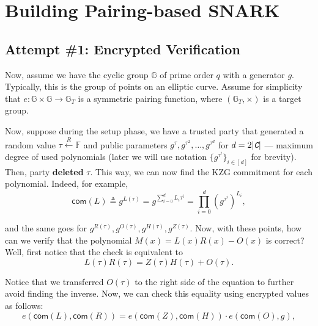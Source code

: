 \documentclass[../lecture-notes.tex]{subfiles}
\begin{document}
\section{Building Pairing-based SNARK}
\subsection{Attempt \#1: Encrypted Verification}

Now, assume we have the cyclic group $\mathbb{G}$ of prime order $q$ with a generator $g$. Typically, this is the group of points on an elliptic curve. Assume for simplicity that $e: \mathbb{G} \times \mathbb{G} \to \mathbb{G}_T$ is a symmetric pairing function, where $(\mathbb{G}_T, \times)$ is a target group.

Now, suppose during the setup phase, we have a trusted party that generated a random value $\tau \xleftarrow{R} \mathbb{F}$ and public parameters $g^{\tau},g^{\tau^2},\dots,g^{\tau^{d}}$ for $d=2|\textit{\texttt{C}}|$ --- maximum degree of used polynomials (later we will use notation $\{g^{\tau^i}\}_{i \in [d]}$ for brevity). Then, party \textbf{deleted} $\tau$. This way, we can now find the KZG commitment for each polynomial. Indeed, for example,
\begin{equation*}
    \mathsf{com}(L) \triangleq g^{L(\tau)} = g^{\sum_{i=0}^d L_i \tau^i} = \prod_{i=0}^d (g^{\tau^i})^{L_i},
\end{equation*}

and the same goes for $g^{R(\tau)}, g^{O(\tau)}, g^{H(\tau)}, g^{Z(\tau)}$. Now, with these points, how can we verify that the polynomial $M(x) = L(x)R(x) - O(x)$ is correct? Well, first notice that the check is equivalent to
\begin{equation*}
    L(\tau)R(\tau) = Z(\tau)H(\tau) + O(\tau).
\end{equation*}

Notice that we transferred $O(\tau)$ to the right side of the equation to further avoid finding the inverse. Now, we can check this equality using encrypted values as follows:
\begin{equation*}
    e(\mathsf{com}(L), \mathsf{com}(R)) = e(\mathsf{com}(Z), \mathsf{com}(H)) \cdot e(\mathsf{com}(O), g),
\end{equation*}
\end{document}
